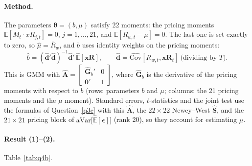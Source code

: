 \documentclass[11pt]{article}
\begin{document}
\paragraph{Method.}
The parameters $\bm{\theta} = (b, \mu)$ satisfy 22 moments: the pricing moments
$\mathbb{E}[M_t \cdot xR_{j,t}] = 0$, $j = 1, \dots, 21$, and $\mathbb{E}[R_{w,t} - \mu] = 0$. The last one
is set exactly to zero, so $\hat{\mu} = \overline{R}_w$, and $b$ uses identity weights on the pricing moments:
\[
  \hat{b} = (\hat{\mathbf{d}}'\hat{\mathbf{d}})^{-1}\hat{\mathbf{d}}'\,\widehat{\mathbb{E}}[\mathbf{xR}],
  \qquad \hat{\mathbf{d}} = \widehat{\mathrm{Cov}}[R_{w,t}, \mathbf{xR}_t] \ \text{(dividing by $T$)}.
\]
This is GMM with $\hat{\mathbf{A}} = \begin{bmatrix} \hat{\mathbf{G}}_b' & 0 \\ \mathbf{0}' & 1 \end{bmatrix}$,
where $\hat{\mathbf{G}}_b$ is the derivative of the pricing moments with respect to $b$ (rows: parameters $b$
and $\mu$; columns: the 21 pricing moments and the $\mu$ moment). Standard errors, $t$-statistics and the
joint test use the formulas of Question~\ref{q3c} with this $\hat{\mathbf{A}}$, the $22 \times 22$
Newey--West $\hat{\mathbf{S}}$, and the $21 \times 21$ pricing block of
$\mathrm{aVar}\big[\widehat{\mathbb{E}}[\bm{\epsilon}]\big]$ (rank 20), so they account for estimating $\mu$.

\paragraph{Result (1)--(2).}
Table~\ref{tab:q4b}.

\begin{table}[p]
  \centering
  \small
  \renewcommand{\arraystretch}{0.9}
  \captionsetup{font=small}
  
  \caption{First-stage GMM estimate of $b$ in $M_t = 1 - b\,(R_{w,t} - \mu)$ with identity weights on the 21
    pricing moments and $\mathbb{E}[R_{w,t} - \mu] = 0$ satisfied exactly, for both sample versions (rows and
    blocks labelled by version). Samples: (1) Common: December 1940 to December 2021 ($T = 973$ months); (2) Max: June 1928 to December 2021 ($T = 1123$ months). Data: monthly observations of 12-month returns: the 20 decile portfolios
    (value-weighted, nominal, over the 12-month compounded risk-free rate) and
    $xR_{w,t} = e^{r_{e,t}} - e^{r_{f,t}}$ (EQ Dataset, real); $R_{w,t} = e^{r_{e,t}}$. Units: decimals.
    Panel A: estimate with its standard error in the next column; Panel B: pricing errors with
    $t$-statistics, book-to-market and momentum deciles side by side and the market below; Panel C: joint
    test. Standard error and $t$-statistics: Newey--West (1987, 1994), Bartlett kernel, Newey--West (1994)
    automatic lag rounded down (selected lag in Panel C). $\chi^2$: test that the 21 pricing errors are
    jointly zero (Moore--Penrose pseudo-inverse).}
  \label{tab:q4b}
\end{table}
\end{document}
